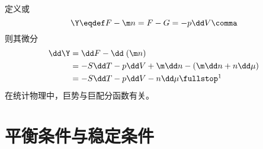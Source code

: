 		定义或
		\begin{equation} \label{EQ_DEF_OF_GRAND_POTENTIAL}
			\Y \eqdef F -\m n = F - G = -p \dd V \comma
		\end{equation}
		则其微分
		\begin{align}
			\dd \Y &= \dd F - \dd \; (\m n) \notag \\
			&= -S \dd T - p \dd V + \m \dd n - (\m \dd n + n \dd \mu) \notag \\
			&= -S \dd T - p \dd V - n \dd \mu \fullstop \footnotemark
		\end{align} 
		在统计物理中，巨势与巨配分函数有关。
		
\section{平衡条件与稳定条件} \label{sec:平衡条件与稳定条件}
